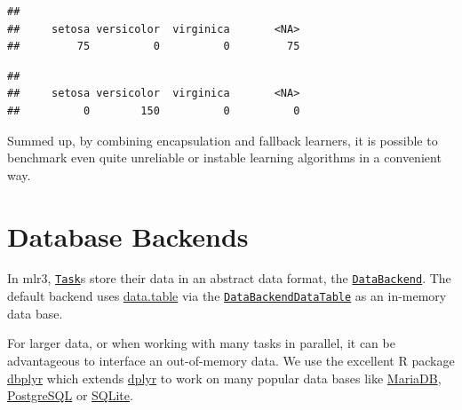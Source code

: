 \documentclass[
]{scrbook}
\newenvironment{Shaded}{\begin{snugshade}}{\end{snugshade}}
\newcommand{\AttributeTok}[1]{\textcolor[rgb]{0.77,0.63,0.00}{#1}}
\newcommand{\CommentTok}[1]{\textcolor[rgb]{0.56,0.35,0.01}{\textit{#1}}}
\newcommand{\FunctionTok}[1]{\textcolor[rgb]{0.00,0.00,0.00}{#1}}
\newcommand{\NormalTok}[1]{#1}
\newcommand{\OtherTok}[1]{\textcolor[rgb]{0.56,0.35,0.01}{#1}}
\newcommand{\SpecialCharTok}[1]{\textcolor[rgb]{0.00,0.00,0.00}{#1}}
\newcommand{\StringTok}[1]{\textcolor[rgb]{0.31,0.60,0.02}{#1}}
\renewenvironment{Shaded} {\begin{snugshade}\small} {\end{snugshade}}
\begin{document}
\begin{verbatim}
## 
##     setosa versicolor  virginica       <NA> 
##         75          0          0         75
\end{verbatim}

\begin{Shaded}
\end{Shaded}

\begin{verbatim}
## 
##     setosa versicolor  virginica       <NA> 
##          0        150          0          0
\end{verbatim}

Summed up, by combining encapsulation and fallback learners, it is possible to benchmark even quite unreliable or instable learning algorithms in a convenient way.

\hypertarget{backends}{%
\section{Database Backends}\label{backends}}

In mlr3, \href{https://mlr3.mlr-org.com/reference/Task.html}{\texttt{Task}}s store their data in an abstract data format, the \href{https://mlr3.mlr-org.com/reference/DataBackend.html}{\texttt{DataBackend}}.
The default backend uses \href{https://cran.r-project.org/package=data.table}{data.table} via the \href{https://mlr3.mlr-org.com/reference/DataBackendDataTable.html}{\texttt{DataBackendDataTable}} as an in-memory data base.

For larger data, or when working with many tasks in parallel, it can be advantageous to interface an out-of-memory data.
We use the excellent R package \href{https://cran.r-project.org/package=dbplyr}{dbplyr} which extends \href{https://cran.r-project.org/package=dplyr}{dplyr} to work on many popular data bases like \href{https://mariadb.org/}{MariaDB}, \href{https://www.postgresql.org/}{PostgreSQL} or \href{https://www.sqlite.org}{SQLite}.
\end{document}
